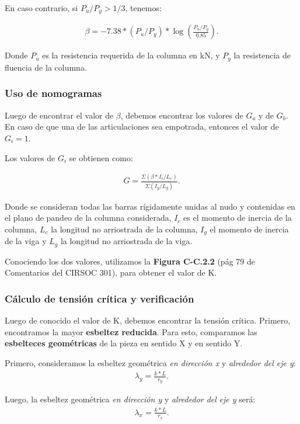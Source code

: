 \documentclass[../main.tex]{subfiles}
\begin{document}
En caso contrario, si $P_u / P_y > 1/3$, tenemos:

\begin{align*}
  \beta = -7.38 * (P_u / P_y) * \log \left( \frac{P_u / P_y}{0.85} \right) 
.\end{align*}

Donde $P_u$ es la resistencia requerida de la columna en kN, y $P_y$ la 
resistencia de fluencia de la columna.

\subsubsection{Uso de nomogramas}

Luego de encontrar el valor de $\beta$, debemos encontrar los valores de $G_a$ 
y de $G_b$. En caso de que una de las articulaciones sea empotrada, entonces el
valor de $G_i = 1$. 

Los valores de  $G_i$ se obtienen como:

 \begin{align*}
   G = \frac{\Sigma (\beta * I_c / L_c)}{\Sigma (I_g / L_g)}
.\end{align*}

Donde se consideran todas las barras rígidamente unidas al nudo y contenidas en
el plano de pandeo de la columna considerada, $I_c$ es el momento de inercia de
la columna, $L_c$ la longitud no arriostrada de la columna, $I_g$ el momento
de inercia de la  viga y $L_g$ la longitud no arriostrada de la viga.

Conociendo los dos valores, utilizamos la \textbf{Figura C-C.2.2} (pág 79 de
Comentarios del CIRSOC 301), para obtener el valor de K.

\subsubsection{Cálculo de tensión crítica y verificación}

Luego de conocido el valor de K, debemos encontrar la tensión crítica. Primero,
encontramos la mayor \textbf{esbeltez reducida}. Para esto, comparamos las
\textbf{esbelteces geométricas} de la pieza en sentido X y en sentido Y.

Primero, consideramos la esbeltez geométrica \textit{en dirección x} y
\textit{alrededor del eje y}:
\begin{align*}
  \lambda_y = \frac{k*L}{r_y}
.\end{align*}

Luego, la esbeltez geométrica \textit{en dirección y} y \textit{alrededor del}
\textit{eje y} será:
\begin{align*}
  \lambda_x = \frac{k*L}{r_x}
.\end{align*}
\end{document}
